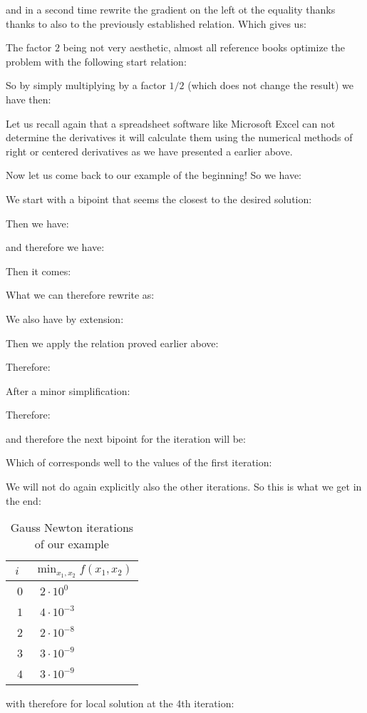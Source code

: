 	and in a second time rewrite the gradient on the left ot the equality thanks thanks to also to the previously established relation. Which gives us:
	
	The factor $2$ being not very aesthetic, almost all reference books optimize the problem with the following start relation:
	
	So by simply multiplying by a factor $1/2$ (which does not change the result) we have then:
		
	Let us recall again that a spreadsheet software like Microsoft Excel can not determine the derivatives it will calculate them using the numerical methods of right or centered derivatives as we have presented a earlier above.

	Now let us come back to our example of the beginning! So we have:
	
	We start with a bipoint that seems the closest to the desired solution:
	
	Then we have:
	
	and therefore we have:
	
	Then it comes:
	
	What we can therefore rewrite as:
	
	We also have by extension:
	
	Then we apply the relation proved earlier above:
	
	Therefore:
	
	After a minor simplification:
	
	Therefore:
	
	and therefore the next bipoint for the iteration will be:
	
	Which of corresponds well to the values of the first iteration:
	
	We will not do again explicitly also the other iterations. So this is what we get in the end:
	\begin{table}[H]
		\begin{center}
				\begin{tabular}{|p{2cm}|p{2cm}|}
					\hline
					\multicolumn{1}{c}{\cellcolor{black!30}$i$} & 
	  \multicolumn{1}{c}{\cellcolor{black!30}$\mathop{\min}_{x_1,x_2} f(x_1,x_2)$}  \\ \hline
					\centering\arraybackslash\ $0$ & \centering\arraybackslash\ $2\cdot 10^0$ \\ \hline	
					\centering\arraybackslash\ $1$ & \centering\arraybackslash\ $4\cdot 10^{-3}$ \\ \hline	
					\centering\arraybackslash\ $2$ & \centering\arraybackslash\ $2\cdot 10^{-8}$ \\ \hline	
					\centering\arraybackslash\ $3$ & \centering\arraybackslash\ $3\cdot 10^{-9}$ \\ \hline	
					\centering\arraybackslash\ $4$ & \centering\arraybackslash\ $3\cdot 10^{-9}$ \\ \hline	
				\end{tabular}
		\end{center}
		\caption[]{Gauss Newton iterations of our example}
	\end{table}
	with therefore for local solution at the 4th iteration:
	
